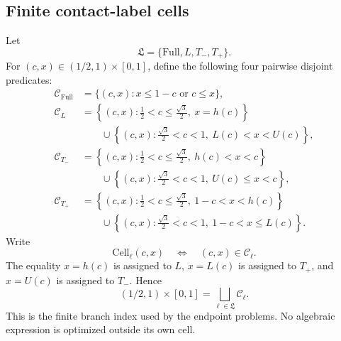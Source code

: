 \subsection{Finite contact-label cells}

Let
\[
 \mathfrak L=\{\mathrm{Full},L,T_-,T_+\}.
\]
For \((c,x)\in(1/2,1)\times[0,1]\), define the following four pairwise
disjoint predicates:
\[
 \begin{aligned}
 \mathcal C_{\mathrm{Full}}
 &=\{(c,x):x\le1-c\text{ or }c\le x\},\\
 \mathcal C_L
 &=\left\{(c,x):
 \frac12<c\le\frac{\sqrt3}{2},\ x=h(c)\right\}\\
 &\qquad{}\cup
 \left\{(c,x):
 \frac{\sqrt3}{2}<c<1,\ L(c)<x<U(c)\right\},\\
 \mathcal C_{T_-}
 &=\left\{(c,x):
 \frac12<c\le\frac{\sqrt3}{2},\ h(c)<x<c\right\}\\
 &\qquad{}\cup
 \left\{(c,x):
 \frac{\sqrt3}{2}<c<1,\ U(c)\le x<c\right\},\\
 \mathcal C_{T_+}
 &=\left\{(c,x):
 \frac12<c\le\frac{\sqrt3}{2},\ 1-c<x<h(c)\right\}\\
 &\qquad{}\cup
 \left\{(c,x):
 \frac{\sqrt3}{2}<c<1,\ 1-c<x\le L(c)\right\}.
 \end{aligned}
\]
Write
\[
 \mathrm{Cell}_{\ell}(c,x)
 \quad\Longleftrightarrow\quad
 (c,x)\in\mathcal C_\ell.
\]
The equality \(x=h(c)\) is assigned to \(L\), \(x=L(c)\) is assigned to
\(T_+\), and \(x=U(c)\) is assigned to \(T_-\).  Hence
\[
 (1/2,1)\times[0,1]
 =
 \bigsqcup_{\ell\in\mathfrak L}\mathcal C_\ell.
\]
This is the finite branch index used by the endpoint problems.  No algebraic
expression is optimized outside its own cell.

